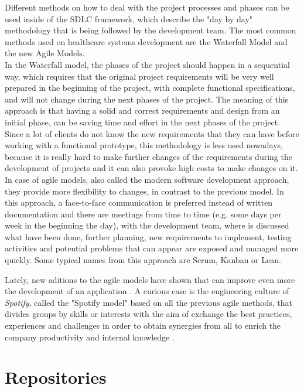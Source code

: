 \documentclass[mim_thesis.tex]{subfiles}
\begin{document}
Different methods on how to deal with the project processes and phases can be used inside of the SDLC framework, which describe the "day by day" methodology that is being followed by the development team. The most common methods used on healthcare systems development are the Waterfall Model and the new Agile Models. \citep{wilcox2014software}\\

In the Waterfall model, the phases of the project should happen in a sequential way, which requires that the original project requirements will be very well prepared in the beginning of the project, with complete functional specifications, and will not change during the next phases of the project. The meaning of this approach is that having a solid and correct requirements and design from an initial phase, can be saving time and effort in the next phases of the project. Since a lot of clients do not know the new requirements that they can have before working with a functional prototype, this methodology is less used nowadays, because it is really hard to make further changes of the requirements during the development of projects and it can also provoke high costs to make changes on it.\\ 

In case of agile models, also called the modern software development approach, they provide more flexibility to changes, in contrast to the previous model. In this approach, a face-to-face communication is preferred instead of written documentation and there are meetings from time to time (e.g. some days per week in the beginning the day), with the development team, where is discussed what have been done, further planning, new requirements to implement, testing activities and potential problems that can appear are exposed and managed more quickly. Some typical names from this approach are Scrum, Kanban or Lean. 

Lately, new aditions to the agile models have shown that can improve even more the development of an application \citep{spotify2017}. A curious case is the engineering culture of \textit{Spotify}, called the "Spotify model" based on all the previous agile methods, that divides groups by skills or interests with the aim of exchange the best practices, experiences and challenges in order to obtain synergies from all to enrich the company productivity and internal knowledge \citep{spotify2012}.
\\


\section{Repositories}
\end{document}
